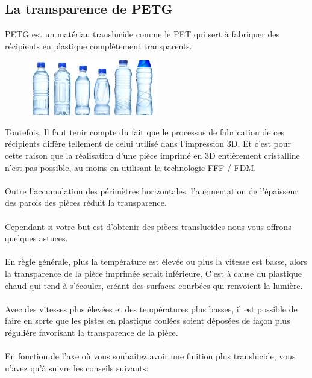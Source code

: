 \documentclass[11pt,a4paper]{article}
\begin{document}
	\subsection{La transparence de PETG}PETG est un matériau translucide comme le PET qui sert à fabriquer des récipients en plastique complètement transparents.
\begin{figure}[H]
\centering
\includegraphics[width=0.5\textwidth,cfbox=azul_marcos 1pt 0pt]{FOTOS/BOTELLASPET}
\end{figure}
Toutefois, Il faut tenir compte du fait que le processus de fabrication de ces récipients diffère tellement de celui utilisé dans l’impression 3D. Et c’est pour cette raison que la réalisation d’une pièce imprimé en 3D entièrement cristalline n'est pas possible, au moins en utilisant la technologie FFF / FDM.
\\\\
Outre l’accumulation des périmètres horizontales, l’augmentation de l’épaisseur des parois des pièces réduit la transparence.
\\\\
Cependant si votre but est d’obtenir des pièces translucides nous vous offrons quelques astuces.
\\\\
En règle générale, plus la température est élevée ou plus la vitesse est basse, alors la transparence de la pièce imprimée serait inférieure. C’est à cause du plastique chaud qui tend à s’écouler, créant des surfaces courbées qui renvoient la lumière.
\\\\
Avec des vitesses plus élevées et des températures plus basses, il est possible de faire en sorte que les pistes en plastique coulées soient déposées de façon plus régulière favorisant la transparence de la pièce.
\\\\
En fonction de l’axe où vous souhaitez avoir une finition plus translucide, vous n’avez qu’à suivre les conseils suivants:
\end{document}
